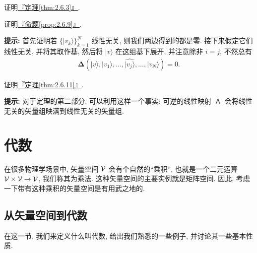 \documentclass[lang=cn,zihao=-4,twoside,fontset=none]{textbook}
\newcommand{\bsf}[1]{{\mathop{\pmb{\mathsf{#1}}}}}
\def\eq#1{\[\begin{aligned}{}#1\end{aligned}\]}
\newcommand{\qt}[1]{\left( #1 \right)}
\newcommand{\BDelta}{{\pmb{\Delta}}}
\newcommand{\propref}[1]{\hyperref[#1]{『命题\textnormal{\ref*{#1}}』}}
\newcommand{\thmref}[1]{\hyperref[#1]{『定理\textnormal{\ref*{#1}}』}}
\newcommand{\set}[1]{\{#1\}}
\renewcommand{\ket}[1]{| #1 \rangle}
\begin{document}
\begin{problem}
    \label{ex:2.36}%
    证明\thmref{thm:2.6.3}.
\end{problem}

\begin{problem}
    \label{ex:2.37}%
    证明\propref{prop:2.6.9}.

    \noindent\textbf{提示:} 首先证明若 $\set{\ket{v_k}}_{k=1}^N$ 线性无关, 则我们两边得到的都是零. 接下来假定它们线性无关, 并将其取作基, 然后将 $\ket{v}$ 在这组基下展开, 并注意除非 $i=j$, 不然总有 
    \eq{
        \BDelta\qt{\ket{v},\ket{v_1},\dots,\widehat{\ket{v_j}},\dots,\ket{v_N}}=0.
    }
\end{problem}

\begin{problem}
    \label{ex:2.38}%
    证明\thmref{thm:2.6.11}.

    \noindent\textbf{提示:} 对于定理的第二部分, 可以利用这样一个事实: 可逆的线性映射 $\bsf{A}$ 会将线性无关的矢量组映满到线性无关的矢量组.
\end{problem}



\chapter{代数}\label{chap:3}

在很多物理学场景中, 矢量空间 ${\mathcal V}$ 会有个自然的``乘积'', 也就是一个二元运算 ${\mathcal V}\times{\mathcal V}\to{\mathcal V}$, 我们称其为乘法. 这种矢量空间的主要实例就是矩阵空间. 因此, 考虑一下带有这种乘积的矢量空间是有用武之地的. 

\section{从矢量空间到代数}\label{sec:3.1}

在这一节, 我们来定义什么叫代数, 给出我们熟悉的一些例子, 并讨论其一些基本性质.
\end{document}
